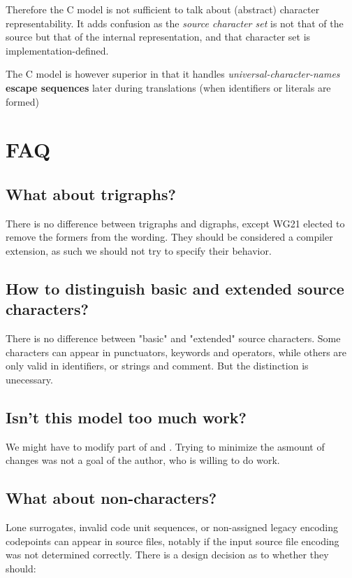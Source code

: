\documentclass{wg21}
\begin{document}
Therefore the C model is not sufficient to talk about (abstract) character representability.
It adds confusion as the \emph{source character set} is not that of the source but that of the internal representation,
and that character set is implementation-defined.

The C model is however superior in that it handles \emph{universal-character-names} \textbf{escape sequences}
later during translations (when identifiers or literals are formed)

\section{FAQ}
\subsection{What about trigraphs?}

There is no difference between trigraphs and digraphs, except WG21 elected to remove the formers
from the wording. They should be considered a compiler extension, as such we should not try to specify their behavior.

\subsection{How to distinguish basic and extended source characters?}

There is no difference between "basic" and "extended" source characters.
Some characters can appear in punctuators, keywords and operators, while others
are only valid in identifiers, or strings and comment.
But the distinction is unecessary.

\subsection{Isn't this model too much work?}

We might have to modify part of \tcode{[lex]} and \tcode{[cpp]}.
Trying to minimize the asmount of changes was not a goal of the author, who is willing to do work.

\subsection{What about non-characters?}

Lone surrogates, invalid code unit sequences, or non-assigned legacy encoding codepoints
can appear in source files, notably if the input source file encoding was not determined correctly.
There is a design decision as to whether they should:
\end{document}

